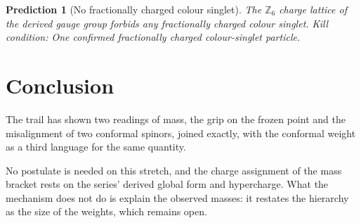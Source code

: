 \documentclass[11pt]{article}
\newtheorem{prediction}[theorem]{Prediction}
\theoremstyle{definition}
\theoremstyle{plain}
\begin{document}
\begin{prediction}[No fractionally charged colour singlet]\label{c:pred.z6-charge-lattice}
The $\mathbb{Z}_{6}$ charge lattice of the derived gauge group forbids any fractionally charged colour singlet.
\emph{Kill condition:} One confirmed fractionally charged colour-singlet particle.
\end{prediction}

\section*{Conclusion}
The trail has shown two readings of mass, the grip on the frozen point and the misalignment of two conformal spinors, joined exactly, with the conformal weight as a third language for the same quantity.

No postulate is needed on this stretch, and the charge assignment of the mass bracket rests on the series' derived global form and hypercharge. What the mechanism does not do is explain the observed masses: it restates the hierarchy as the size of the weights, which remains open.
\end{document}
